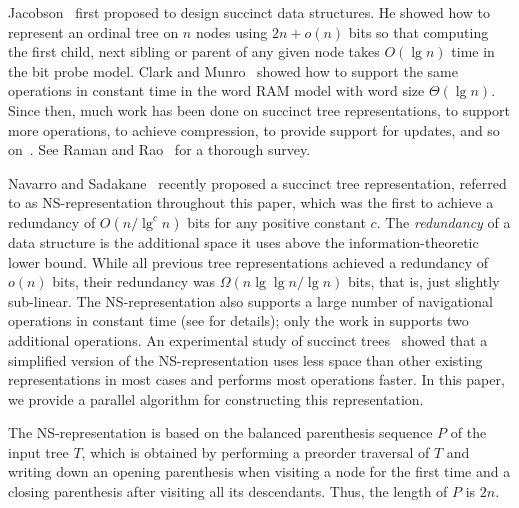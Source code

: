 Jacobson~\cite{j1989} first proposed to design succinct data structures.
He showed how to represent an ordinal tree on $n$ nodes using $2n+o(n)$ bits so
that computing the first child, next sibling or parent of any given node
takes $O(\lg n)$ time in the bit probe model.
Clark and Munro~\cite{cm1996} showed how to support the same operations in
constant time in the word RAM model with word size $\Theta(\lg n)$.
Since then, much work has been done on succinct tree representations, to
support more operations, to achieve compression, to provide support
for updates, and so
on~\cite{mr1997,bdmr1999,grr2004,jss2007,ly2008,hms2012,fm2014,Navarro:2014:FFS:2620785.2601073}.
See Raman and Rao~\cite{rr2013} for a thorough survey.

Navarro and Sadakane~\cite{Navarro:2014:FFS:2620785.2601073} recently proposed a
succinct tree representation, referred to as NS-representation throughout this
paper, which was the first to achieve a redundancy of $O(n/\lg^c n)$ bits
for any positive constant $c$.
The \emph{redundancy} of a data structure is the additional space it uses above
the information-theoretic lower bound.
While all previous tree representations achieved a redundancy of $o(n)$ bits,
their redundancy was $\Omega(n \lg\lg n / \lg n)$ bits, that is, just slightly
sub-linear.
The NS-representation also supports a large number of
navigational operations in constant time (see
\cite{Navarro:2014:FFS:2620785.2601073} for details); only
the work in \cite{hms2012,fm2014} supports two additional operations.
An experimental study of succinct trees~\cite{ACNSalenex10} showed that
a simplified version of the NS-representation uses less space
than other existing representations in most cases and performs most operations
faster.
In this paper, we provide a parallel algorithm for constructing this
representation.

The NS-representation is based on the balanced parenthesis sequence $P$ of
the input tree $T$, which is obtained by performing a preorder traversal
of $T$ and writing down an opening parenthesis when visiting
a node for the first time and a closing parenthesis after visiting
all its descendants.
Thus, the length of $P$ is $2n$.

